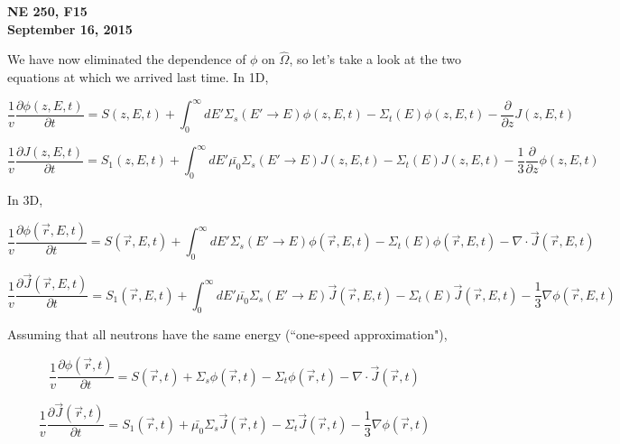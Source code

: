 \documentclass[12pt]{article}
\newcommand{\rvec}{\ensuremath{\vec{r}}}
\newcommand{\omvec}{\ensuremath{\hat{\Omega}}}
\begin{document}
\begin{center}
{\bf NE 250, F15 \\
September 16, 2015}
\end{center}

We have now eliminated the dependence of $\phi$ on $\omvec$, so let's take a look at the two equations at
which we arrived last time. In 1D,

\begin{equation*}
\frac{1}{v}\frac{\partial\phi(z,E,t)}{\partial t} = S(z,E,t) + 
\int^{\infty}_0dE'\Sigma_s(E'\rightarrow E)\phi(z,E,t) - 
\Sigma_t(E)\phi(z,E,t) - \frac{\partial}{\partial z}J(z,E,t)
\end{equation*}

\begin{equation*}
\frac{1}{v}\frac{\partial J(z,E,t)}{\partial t} = S_1(z,E,t) + 
\int^{\infty}_0dE'\bar{\mu_0}\Sigma_s(E'\rightarrow E)J(z,E,t) - 
\Sigma_t(E)J(z,E,t) - \frac{1}{3}\frac{\partial}{\partial z}\phi(z,E,t)
\end{equation*}

In 3D,

\begin{equation*}
\frac{1}{v}\frac{\partial\phi(\rvec,E,t)}{\partial t} = S(\rvec,E,t) + 
\int^{\infty}_0dE'\Sigma_s(E'\rightarrow E)\phi(\rvec,E,t) - 
\Sigma_t(E)\phi(\rvec,E,t) - \nabla\cdot\vec{J}(\rvec,E,t)
\end{equation*}

\begin{equation*}
\frac{1}{v}\frac{\partial \vec{J}(\rvec,E,t)}{\partial t} = S_1(\rvec,E,t) + 
\int^{\infty}_0dE'\bar{\mu_0}\Sigma_s(E'\rightarrow E)\vec{J}(\rvec,E,t) - 
\Sigma_t(E)\vec{J}(\rvec,E,t) - \frac{1}{3}\nabla\phi(\rvec,E,t)
\end{equation*}

Assuming that all neutrons have the same energy (``one-speed approximation"),

\begin{equation*}
\frac{1}{v}\frac{\partial\phi(\rvec,t)}{\partial t} = S(\rvec,t) + 
\Sigma_s\phi(\rvec,t) - 
\Sigma_t\phi(\rvec,t) - \nabla\cdot\vec{J}(\rvec,t)
\end{equation*}

\begin{equation*}
\frac{1}{v}\frac{\partial \vec{J}(\rvec,t)}{\partial t} = S_1(\rvec,t) + 
\bar{\mu_0}\Sigma_s\vec{J}(\rvec,t) - 
\Sigma_t\vec{J}(\rvec,t) - \frac{1}{3}\nabla\phi(\rvec,t)
\end{equation*}
\end{document}
